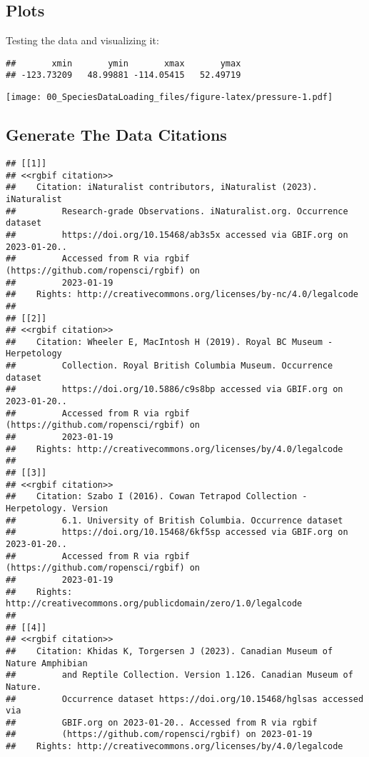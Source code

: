 \documentclass[
]{article}
\begin{document}
\hypertarget{plots}{%
\subsection{Plots}\label{plots}}

Testing the data and visualizing it:

\begin{verbatim}
##       xmin       ymin       xmax       ymax 
## -123.73209   48.99881 -114.05415   52.49719
\end{verbatim}

\texttt{[image: 00\_SpeciesDataLoading\_files/figure-latex/pressure-1.pdf]}

\hypertarget{generate-the-data-citations}{%
\subsection{Generate The Data
Citations}\label{generate-the-data-citations}}

\begin{verbatim}
## [[1]]
## <<rgbif citation>>
##    Citation: iNaturalist contributors, iNaturalist (2023). iNaturalist
##         Research-grade Observations. iNaturalist.org. Occurrence dataset
##         https://doi.org/10.15468/ab3s5x accessed via GBIF.org on 2023-01-20..
##         Accessed from R via rgbif (https://github.com/ropensci/rgbif) on
##         2023-01-19
##    Rights: http://creativecommons.org/licenses/by-nc/4.0/legalcode
## 
## [[2]]
## <<rgbif citation>>
##    Citation: Wheeler E, MacIntosh H (2019). Royal BC Museum - Herpetology
##         Collection. Royal British Columbia Museum. Occurrence dataset
##         https://doi.org/10.5886/c9s8bp accessed via GBIF.org on 2023-01-20..
##         Accessed from R via rgbif (https://github.com/ropensci/rgbif) on
##         2023-01-19
##    Rights: http://creativecommons.org/licenses/by/4.0/legalcode
## 
## [[3]]
## <<rgbif citation>>
##    Citation: Szabo I (2016). Cowan Tetrapod Collection - Herpetology. Version
##         6.1. University of British Columbia. Occurrence dataset
##         https://doi.org/10.15468/6kf5sp accessed via GBIF.org on 2023-01-20..
##         Accessed from R via rgbif (https://github.com/ropensci/rgbif) on
##         2023-01-19
##    Rights: http://creativecommons.org/publicdomain/zero/1.0/legalcode
## 
## [[4]]
## <<rgbif citation>>
##    Citation: Khidas K, Torgersen J (2023). Canadian Museum of Nature Amphibian
##         and Reptile Collection. Version 1.126. Canadian Museum of Nature.
##         Occurrence dataset https://doi.org/10.15468/hglsas accessed via
##         GBIF.org on 2023-01-20.. Accessed from R via rgbif
##         (https://github.com/ropensci/rgbif) on 2023-01-19
##    Rights: http://creativecommons.org/licenses/by/4.0/legalcode
\end{verbatim}
\end{document}
